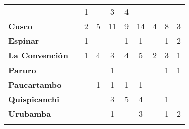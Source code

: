 \begin{tabular}{lccccccccc}
	&\cellcolor[HTML]{FCC46C} 					&1
	&\cellcolor[HTML]{FCC46C}					&3
	&4											&\cellcolor[HTML]{FCC46C}\\
	\textbf{Cusco}                            						
	&\cellcolor[HTML]{FCC46C}					
	&2											&5
	&11											&9 	
	&14 										&4
	&8											&3\\
	\textbf{Espinar}       					             									
	&\cellcolor[HTML]{FCC46C}				    &1
	&\cellcolor[HTML]{FCC46C} 					&\cellcolor[HTML]{FCC46C}
	&1											&1
	&\cellcolor[HTML]{FCC46C}					&1
	&2\\
	\textbf{La Convención}                      		
	&\cellcolor[HTML]{FCC46C} 		            &1 					
	&4 											&3
	&4											&5
	&2											&3
	&1\\
	\textbf{Paruro}                            
    &\cellcolor[HTML]{FCC46C} 					&\cellcolor[HTML]{FCC46C}		 			&\cellcolor[HTML]{FCC46C}					
	&1
	&\cellcolor[HTML]{FCC46C}					&\cellcolor[HTML]{FCC46C}
	&\cellcolor[HTML]{FCC46C} 					&1
	&1\\
	\textbf{Paucartambo}               		                       					
	&\cellcolor[HTML]{FCC46C}                   &\cellcolor[HTML]{FCC46C} 					&1
	&1											&1		
	&1											&\cellcolor[HTML]{FCC46C}
	&\cellcolor[HTML]{FCC46C}
	&\cellcolor[HTML]{FCC46C}\\
	\textbf{Quispicanchi}                                         	                  		
	&\cellcolor[HTML]{FCC46C} 
	&\cellcolor[HTML]{FCC46C}					&\cellcolor[HTML]{FCC46C}
	&3											&5
	&4											&\cellcolor[HTML]{FCC46C}
	&1											&\cellcolor[HTML]{FCC46C}\\
	\textbf{Urubamba}                                                          		
	&\cellcolor[HTML]{FCC46C}					&\cellcolor[HTML]{FCC46C}
	&\cellcolor[HTML]{FCC46C}					&1
	&\cellcolor[HTML]{FCC46C}					&3
	&\cellcolor[HTML]{FCC46C}					&1
	&2\\	
	&\multicolumn{1}{l}{}                       &\multicolumn{1}{l}{}            &\multicolumn{1}{l}{}                         
	&\multicolumn{1}{l}{}                       &\multicolumn{1}{l}{}            &\multicolumn{1}{l}{}                       &\multicolumn{1}{l}{}                       &\multicolumn{1}{l}{}            &\multicolumn{1}{l}{}    
\end{tabular}